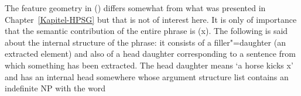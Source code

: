 \begin{figure}
\eanoraggedright
\label{ex-avm-mich-tritt-ein-Pferd}
\z
\vspace{-\baselineskip}
\end{figure}%
The feature geometry in () differs somewhat from what was presented in Chapter~\ref{Kapitel-HPSG} but that is not of interest here.
It is only of importance that the semantic contribution of the entire phrase is (x).
The following is said about the internal structure of the phrase: it consists of a filler"=daughter (an extracted element) and also
of a head daughter corresponding to a sentence from which something has been extracted. The head
daughter means `a horse kicks x' and has an internal head somewhere whose argument structure list contains an indefinite NP with the word
